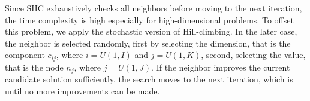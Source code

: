 Since SHC exhaustively checks all neighbors before moving to the next iteration, the time complexity is high especially for high-dimensional problems. To offset this problem, we apply the stochastic version of Hill-climbing. In the later case, the neighbor is selected randomly, first by selecting the dimension, that is the component $c_{ij}$, where $i=U(1,I)$ and $j=U(1,K)$, second, selecting the value, that is the node $n_j$, where $j=U(1,J)$. If the neighbor improves the current candidate solution sufficiently, the search moves to the next iteration, which is until no more improvements can be made.

